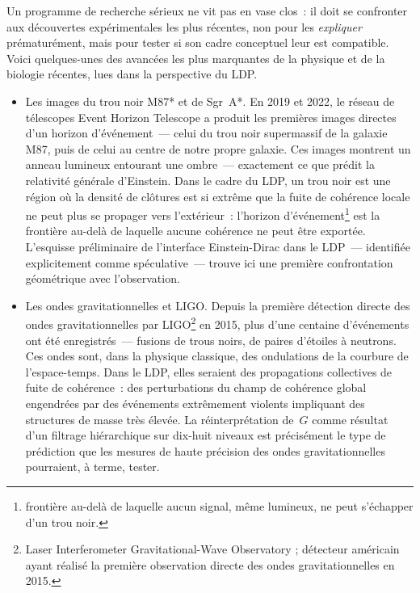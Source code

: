 \documentclass[12pt, a4paper, openright]{book}
\begin{document}
Un programme de recherche sérieux ne vit pas en vase clos~: il doit se confronter aux découvertes expérimentales les plus récentes, non pour les \emph{expliquer} prématurément, mais pour tester si son cadre conceptuel leur est compatible. Voici quelques-unes des avancées les plus marquantes de la physique et de la biologie récentes, lues dans la perspective du LDP.

\begin{itemize}

\item Les images du trou noir M87* et de Sgr~A*. En 2019 et 2022, le réseau de télescopes Event Horizon Telescope a produit les premières images directes d'un horizon d'événement~--- celui du trou noir supermassif de la galaxie M87, puis de celui au centre de notre propre galaxie. Ces images montrent un anneau lumineux entourant une ombre~--- exactement ce que prédit la relativité générale d'Einstein. Dans le cadre du LDP, un trou noir est une région où la densité de clôtures est si extrême que la fuite de cohérence locale ne peut plus se propager vers l'extérieur~: l'horizon d'événement\footnote{frontière au-delà de laquelle aucun signal, même lumineux, ne peut s'échapper d'un trou noir.} est la frontière au-delà de laquelle aucune cohérence ne peut être exportée. L'esquisse préliminaire de l'interface Einstein-Dirac dans le LDP~--- identifiée explicitement comme spéculative~--- trouve ici une première confrontation géométrique avec l'observation.

\item Les ondes gravitationnelles et LIGO. Depuis la première détection directe des ondes gravitationnelles par LIGO\footnote{Laser Interferometer Gravitational-Wave Observatory ; détecteur américain ayant réalisé la première observation directe des ondes gravitationnelles en 2015.} en 2015, plus d'une centaine d'événements ont été enregistrés~--- fusions de trous noirs, de paires d'étoiles à neutrons. Ces ondes sont, dans la physique classique, des ondulations de la courbure de l'espace-temps. Dans le LDP, elles seraient des propagations collectives de fuite de cohérence~: des perturbations du champ de cohérence global engendrées par des événements extrêmement violents impliquant des structures de masse très élevée. La réinterprétation de~$G$ comme résultat d'un filtrage hiérarchique sur dix-huit niveaux est précisément le type de prédiction que les mesures de haute précision des ondes gravitationnelles pourraient, à terme, tester.


\end{itemize}
\end{document}
